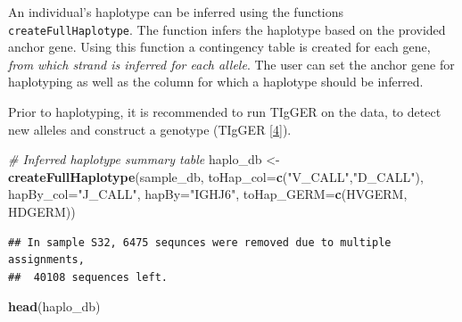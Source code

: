 \documentclass[11pt,]{article}
\newenvironment{Shaded}{}{}
\newcommand{\KeywordTok}[1]{\textcolor[rgb]{0.00,0.44,0.13}{\textbf{#1}}}
\newcommand{\DataTypeTok}[1]{\textcolor[rgb]{0.56,0.13,0.00}{#1}}
\newcommand{\StringTok}[1]{\textcolor[rgb]{0.25,0.44,0.63}{#1}}
\newcommand{\CommentTok}[1]{\textcolor[rgb]{0.38,0.63,0.69}{\textit{#1}}}
\newcommand{\NormalTok}[1]{#1}
\begin{document}
An individual's haplotype can be inferred using the functions
\texttt{createFullHaplotype}. The function infers the haplotype based on
the provided anchor gene. Using this function a contingency table is
created for each gene, \emph{from which strand is inferred for each
allele}. The user can set the anchor gene for haplotyping as well as the
column for which a haplotype should be inferred.

Prior to haplotyping, it is recommended to run TIgGER on the data, to
detect new alleles and construct a genotype (TIgGER
\href{https://tigger.readthedocs.io/en/0.3.1/}{{[}4{]}}).

\begin{Shaded}
\begin{Highlighting}[]
\CommentTok{# Inferred haplotype summary table}
\NormalTok{haplo_db <-}\StringTok{ }\KeywordTok{createFullHaplotype}\NormalTok{(sample_db, }\DataTypeTok{toHap_col=}\KeywordTok{c}\NormalTok{(}\StringTok{"V_CALL"}\NormalTok{,}\StringTok{"D_CALL"}\NormalTok{),}
                                \DataTypeTok{hapBy_col=}\StringTok{"J_CALL"}\NormalTok{, }\DataTypeTok{hapBy=}\StringTok{"IGHJ6"}\NormalTok{, }
                                \DataTypeTok{toHap_GERM=}\KeywordTok{c}\NormalTok{(HVGERM, HDGERM))}
\end{Highlighting}
\end{Shaded}

\begin{verbatim}
## In sample S32, 6475 sequnces were removed due to multiple assignments,
##  40108 sequences left.
\end{verbatim}

\begin{Shaded}
\begin{Highlighting}[]
\KeywordTok{head}\NormalTok{(haplo_db)}
\end{Highlighting}
\end{Shaded}
\end{document}
